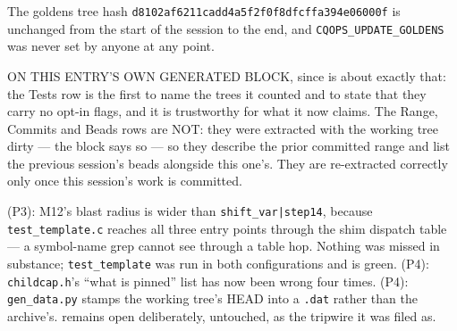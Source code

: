 The goldens tree hash \texttt{d8102af6211cadd4a5f2f0f8dfcffa394e06000f} is unchanged from
the start of the session to the end, and \texttt{CQOPS\_UPDATE\_GOLDENS} was never set by
anyone at any point.

ON THIS ENTRY'S OWN GENERATED BLOCK, since  is about exactly that: the Tests row
is the first to name the trees it counted and to state that they carry no opt-in flags, and
it is trustworthy for what it now claims. The Range, Commits and Beads rows are NOT: they
were extracted with the working tree dirty --- the block says so --- so they describe the
prior committed range and list the previous session's beads alongside this one's. They are
re-extracted correctly only once this session's work is committed.

 (P3): M12's blast radius is wider than \texttt{shift\_var|step14}, because
\texttt{test\_template.c} reaches all three entry points through the shim dispatch table ---
a symbol-name grep cannot see through a table hop. Nothing was missed in substance;
\texttt{test\_template} was run in both configurations and is green.
 (P4): \texttt{childcap.h}'s ``what is pinned'' list has now been wrong four times.
 (P4): \texttt{gen\_data.py} stamps the working tree's HEAD into a \texttt{.dat}
rather than the archive's.
 remains open deliberately, untouched, as the tripwire it was filed as.
